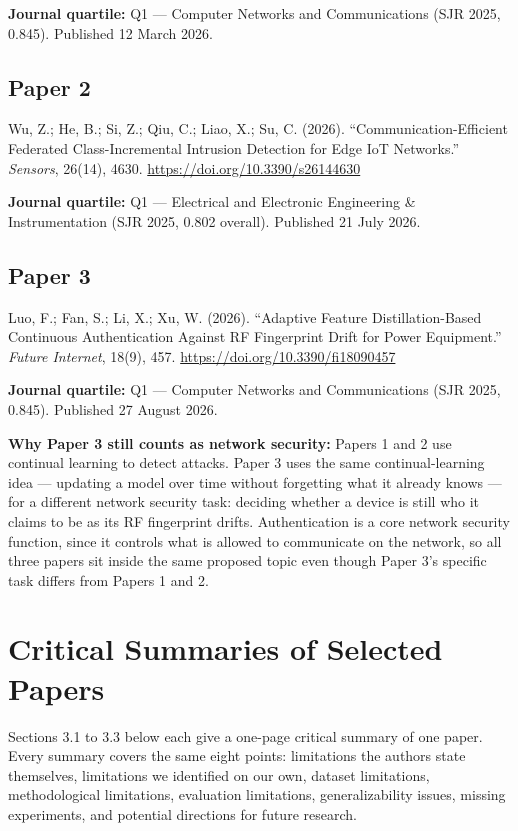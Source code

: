 \documentclass[10pt]{article}
\begin{document}
\noindent\textbf{Journal quartile:} Q1 --- Computer Networks and Communications (SJR 2025, 0.845). Published 12 March 2026.

\subsection*{Paper 2}
Wu, Z.; He, B.; Si, Z.; Qiu, C.; Liao, X.; Su, C. (2026). \enquote{Communication-Efficient Federated Class-Incremental Intrusion Detection for Edge IoT Networks.} \textit{Sensors}, 26(14), 4630. \url{https://doi.org/10.3390/s26144630}

\noindent\textbf{Journal quartile:} Q1 --- Electrical and Electronic Engineering \& Instrumentation (SJR 2025, 0.802 overall). Published 21 July 2026.

\subsection*{Paper 3}
Luo, F.; Fan, S.; Li, X.; Xu, W. (2026). \enquote{Adaptive Feature Distillation-Based Continuous Authentication Against RF Fingerprint Drift for Power Equipment.} \textit{Future Internet}, 18(9), 457. \url{https://doi.org/10.3390/fi18090457}

\noindent\textbf{Journal quartile:} Q1 --- Computer Networks and Communications (SJR 2025, 0.845). Published 27 August 2026.

\medskip
\noindent\textbf{Why Paper 3 still counts as network security:} Papers 1 and 2 use continual learning to detect attacks. Paper 3 uses the same continual-learning idea --- updating a model over time without forgetting what it already knows --- for a different network security task: deciding whether a device is still who it claims to be as its RF fingerprint drifts. Authentication is a core network security function, since it controls what is allowed to communicate on the network, so all three papers sit inside the same proposed topic even though Paper 3's specific task differs from Papers 1 and 2.

\section{Critical Summaries of Selected Papers}

Sections 3.1 to 3.3 below each give a one-page critical summary of one paper. Every summary covers the same eight points: limitations the authors state themselves, limitations we identified on our own, dataset limitations, methodological limitations, evaluation limitations, generalizability issues, missing experiments, and potential directions for future research.
\end{document}
